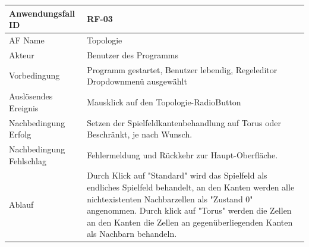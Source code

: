 \documentclass[11pt,a4paper]{article}
\begin{document}
	\begin{tabular}[m]{|m{7cm}|m{9cm}|}
		\hline
		Anwendungsfall ID     & RF-03 \\ %
		\hline
		AF Name     &  Topologie \\
		\hline
		Akteur&Benutzer des Programms \\
		\hline
		Vorbedingung&Programm gestartet, Benutzer lebendig, Regeleditor Dropdownmenü ausgewählt\\
		\hline
		Auslösendes Ereignis&Mausklick auf den Topologie-RadioButton\\
		\hline
		Nachbedingung Erfolg&Setzen der Spielfeldkantenbehandlung auf Torus oder Beschränkt, je nach Wunsch.\\
		\hline
		Nachbedingung Fehlschlag&Fehlermeldung und Rückkehr zur Haupt-Oberfläche.\\
		\hline
		Ablauf&Durch Klick auf "Standard" wird das Spielfeld als endliches Spielfeld behandelt, an den Kanten werden alle nichtexistenten Nachbarzellen als "Zustand 0"  angenommen.
		Durch klick auf "Torus" werden die Zellen an den Kanten die Zellen an gegenüberliegenden Kanten als Nachbarn behandeln.\\
		\hline
	\end{tabular}
	
\end{document}
